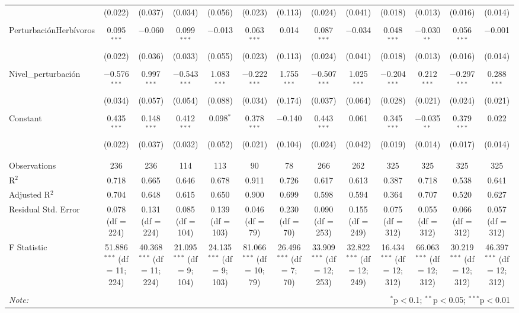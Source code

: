 \documentclass[spanish,11pt]{article}
\begin{document}
\begin{table}[!htbp]
\begin{tabular}{@{\extracolsep{5pt}}lcccccccccccc}
  & (0.022) & (0.037) & (0.034) & (0.056) & (0.023) & (0.113) & (0.024) & (0.041) & (0.018) & (0.013) & (0.016) & (0.014) \\ 
  & & & & & & & & & & & & \\ 
 PerturbaciónHerbívoros & 0.095$^{***}$ & $-$0.060 & 0.099$^{***}$ & $-$0.013 & 0.063$^{***}$ & 0.014 & 0.087$^{***}$ & $-$0.034 & 0.048$^{***}$ & $-$0.030$^{**}$ & 0.056$^{***}$ & $-$0.001 \\ 
  & (0.022) & (0.036) & (0.033) & (0.055) & (0.023) & (0.113) & (0.024) & (0.041) & (0.018) & (0.013) & (0.016) & (0.014) \\ 
  & & & & & & & & & & & & \\ 
 Nivel\_perturbación & $-$0.576$^{***}$ & 0.997$^{***}$ & $-$0.543$^{***}$ & 1.083$^{***}$ & $-$0.222$^{***}$ & 1.755$^{***}$ & $-$0.507$^{***}$ & 1.025$^{***}$ & $-$0.204$^{***}$ & 0.212$^{***}$ & $-$0.297$^{***}$ & 0.288$^{***}$ \\ 
  & (0.034) & (0.057) & (0.054) & (0.088) & (0.034) & (0.174) & (0.037) & (0.064) & (0.028) & (0.021) & (0.024) & (0.021) \\ 
  & & & & & & & & & & & & \\ 
 Constant & 0.435$^{***}$ & 0.148$^{***}$ & 0.412$^{***}$ & 0.098$^{*}$ & 0.378$^{***}$ & $-$0.140 & 0.443$^{***}$ & 0.061 & 0.345$^{***}$ & $-$0.035$^{**}$ & 0.379$^{***}$ & 0.022 \\ 
  & (0.022) & (0.037) & (0.032) & (0.052) & (0.021) & (0.104) & (0.024) & (0.042) & (0.019) & (0.014) & (0.017) & (0.014) \\ 
  & & & & & & & & & & & & \\ 
\hline \\[-1.8ex] 
Observations & 236 & 236 & 114 & 113 & 90 & 78 & 266 & 262 & 325 & 325 & 325 & 325 \\ 
R$^{2}$ & 0.718 & 0.665 & 0.646 & 0.678 & 0.911 & 0.726 & 0.617 & 0.613 & 0.387 & 0.718 & 0.538 & 0.641 \\ 
Adjusted R$^{2}$ & 0.704 & 0.648 & 0.615 & 0.650 & 0.900 & 0.699 & 0.598 & 0.594 & 0.364 & 0.707 & 0.520 & 0.627 \\ 
Residual Std. Error & 0.078 (df = 224) & 0.131 (df = 224) & 0.085 (df = 104) & 0.139 (df = 103) & 0.046 (df = 79) & 0.230 (df = 70) & 0.090 (df = 253) & 0.155 (df = 249) & 0.075 (df = 312) & 0.055 (df = 312) & 0.066 (df = 312) & 0.057 (df = 312) \\ 
F Statistic & 51.886$^{***}$ (df = 11; 224) & 40.368$^{***}$ (df = 11; 224) & 21.095$^{***}$ (df = 9; 104) & 24.135$^{***}$ (df = 9; 103) & 81.066$^{***}$ (df = 10; 79) & 26.496$^{***}$ (df = 7; 70) & 33.909$^{***}$ (df = 12; 253) & 32.822$^{***}$ (df = 12; 249) & 16.434$^{***}$ (df = 12; 312) & 66.063$^{***}$ (df = 12; 312) & 30.219$^{***}$ (df = 12; 312) & 46.397$^{***}$ (df = 12; 312) \\ 
\hline 
\hline \\[-1.8ex] 
\textit{Note:}  & \multicolumn{12}{r}{$^{*}$p$<$0.1; $^{**}$p$<$0.05; $^{***}$p$<$0.01} \\ 
\end{tabular} 
\end{table} 
\end{document}
